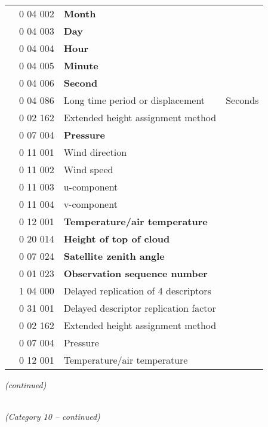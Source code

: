 \begin{longtable}[]{@{}llll@{}}
& 0 04 002 & \textbf{Month} &\tabularnewline
& 0 04 003 & \textbf{Day} &\tabularnewline
& 0 04 004 & \textbf{Hour} &\tabularnewline
& 0 04 005 & \textbf{Minute} &\tabularnewline
& 0 04 006 & \textbf{Second} &\tabularnewline
& 0 04 086 & Long time period or displacement & Seconds\tabularnewline
& 0 02 162 & Extended height assignment method &\tabularnewline
& 0 07 004 & \textbf{Pressure} &\tabularnewline
& 0 11 001 & Wind direction &\tabularnewline
& 0 11 002 & Wind speed &\tabularnewline
& 0 11 003 & u-component &\tabularnewline
& 0 11 004 & v-component &\tabularnewline
& 0 12 001 & \textbf{Temperature/air temperature} &\tabularnewline
& 0 20 014 & \textbf{Height of top of cloud} &\tabularnewline
& 0 07 024 & \textbf{Satellite zenith angle} &\tabularnewline
& 0 01 023 & \textbf{Observation sequence number} &\tabularnewline
& 1 04 000 & Delayed replication of 4 descriptors &\tabularnewline
& 0 31 001 & Delayed descriptor replication factor &\tabularnewline
& 0 02 162 & Extended height assignment method &\tabularnewline
& 0 07 004 & Pressure &\tabularnewline
& 0 12 001 & Temperature/air temperature &\tabularnewline
\bottomrule
\end{longtable}

\emph{(continued)}

\emph{\\
(Category 10 -- continued)}

